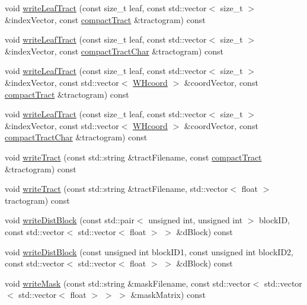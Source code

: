 \begin{DoxyCompactItemize}
\item 
void \hyperlink{classfileManager_aa35414e6c4512c5570ed073b8336accb}{write\-Leaf\-Tract} (const size\-\_\-t leaf, const std\-::vector$<$ size\-\_\-t $>$ \&index\-Vector, const \hyperlink{classcompactTract}{compact\-Tract} \&tractogram) const 
\item 
void \hyperlink{classfileManager_a9541b3a31e4a8d22ce4266c8be97dda1}{write\-Leaf\-Tract} (const size\-\_\-t leaf, const std\-::vector$<$ size\-\_\-t $>$ \&index\-Vector, const \hyperlink{classcompactTractChar}{compact\-Tract\-Char} \&tractogram) const 
\item 
void \hyperlink{classfileManager_abb98e5c6b28ccadbfccba2d380f60f88}{write\-Leaf\-Tract} (const size\-\_\-t leaf, const std\-::vector$<$ size\-\_\-t $>$ \&index\-Vector, const std\-::vector$<$ \hyperlink{classWHcoord}{\-W\-Hcoord} $>$ \&coord\-Vector, const \hyperlink{classcompactTract}{compact\-Tract} \&tractogram) const 
\item 
void \hyperlink{classfileManager_a8962f9967225f802d9a1f7f5746a4b69}{write\-Leaf\-Tract} (const size\-\_\-t leaf, const std\-::vector$<$ size\-\_\-t $>$ \&index\-Vector, const std\-::vector$<$ \hyperlink{classWHcoord}{\-W\-Hcoord} $>$ \&coord\-Vector, const \hyperlink{classcompactTractChar}{compact\-Tract\-Char} \&tractogram) const 
\item 
void \hyperlink{classfileManager_abc9e289891801cecb4abef1a934a591f}{write\-Tract} (const std\-::string \&tract\-Filename, const \hyperlink{classcompactTract}{compact\-Tract} \&tractogram) const 
\item 
void \hyperlink{classfileManager_aeb85f3c16621b69a686738463a59b928}{write\-Tract} (const std\-::string \&tract\-Filename, std\-::vector$<$ float $>$ tractogram) const 
\item 
void \hyperlink{classfileManager_acdcf3f24fb2ce3970f28b8ffbcafb9ae}{write\-Dist\-Block} (const std\-::pair$<$ unsigned int, unsigned int $>$ block\-I\-D, const std\-::vector$<$ std\-::vector$<$ float $>$ $>$ \&d\-Block) const 
\item 
void \hyperlink{classfileManager_adbe45e18c2b47f84defc35586ed2f87b}{write\-Dist\-Block} (const unsigned int block\-I\-D1, const unsigned int block\-I\-D2, const std\-::vector$<$ std\-::vector$<$ float $>$ $>$ \&d\-Block) const 
\item 
void \hyperlink{classfileManager_a18e9cfa58d91e74abd5dc5e3058fe48c}{write\-Mask} (const std\-::string \&mask\-Filename, const std\-::vector$<$ std\-::vector$<$ std\-::vector$<$ float $>$ $>$ $>$ \&mask\-Matrix) const 

\end{DoxyCompactItemize}
